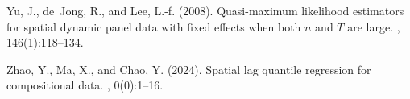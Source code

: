 \documentclass[12pt]{article}
\theoremstyle{plain}
\theoremstyle{definition}
\begin{document}
\begin{thebibliography}{}
	Yu, J., de~Jong, R., and Lee, L.-f. (2008).
	\newblock Quasi-maximum likelihood estimators for spatial dynamic panel data
	with fixed effects when both $n$ and ${T}$ are large.
	, 146(1):118--134.
	
	Zhao, Y., Ma, X., and Chao, Y. (2024).
	\newblock Spatial lag quantile regression for compositional data.
	,
	0(0):1--16.
	
\end{thebibliography}
\end{document}
